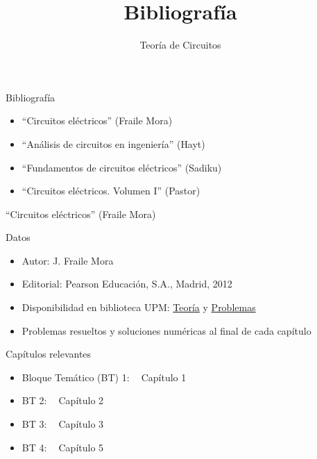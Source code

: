 \documentclass[aspectratio=169, usenames,svgnames,dvipsnames]{beamer}
\date{}
\title{\LARGE Bibliografía \vspace{5mm}}
\subtitle{Teoría de Circuitos}
\begin{document}
\maketitle


\begin{frame}{Bibliografía}
    \begin{itemize}
    \item ``Circuitos eléctricos'' (\alert{Fraile Mora})
    \vspace{3mm}
    \item ``Análisis de circuitos en ingeniería'' (\alert{Hayt})
    \vspace{3mm}
    \item ``Fundamentos de circuitos eléctricos'' (\alert{Sadiku})
    \vspace{3mm}
    \item ``Circuitos eléctricos. Volumen I'' (\alert{Pastor})
    \end{itemize}
\end{frame}


\begin{frame}{``Circuitos eléctricos'' (\alert{Fraile Mora})}
    \begin{block}{Datos}
        \begin{itemize}
        \item Autor: J. Fraile Mora
        \item Editorial: Pearson Educación, S.A., Madrid, 2012
        \item Disponibilidad en biblioteca UPM: \href{https://ingenio.upm.es/primo-explore/fulldisplay?docid=34UPM\_ALMA2150534070004212\&context=L\&vid=34UPM\_VU1\&search\_scope=TAB1\_SCOPE1\&tab=tab1\&lang=es\_ES}{Teoría} y \href{https://ingenio.upm.es/permalink/f/1vo0cl5/34UPM\_ALMA2164586310004212}{Problemas}
        \item Problemas resueltos y soluciones numéricas al final de cada capítulo
        \end{itemize}
    \end{block}

    \begin{block}{Capítulos relevantes}
        \begin{itemize}
        \item Bloque Temático (BT) 1: $\;\;$ Capítulo 1
        \item BT 2: $\;\;$ Capítulo 2
        \item BT 3: $\;\;$ Capítulo 3
        \item BT 4: $\;\;$ Capítulo 5
        \end{itemize}
    \end{block}
\end{frame}
\end{document}
